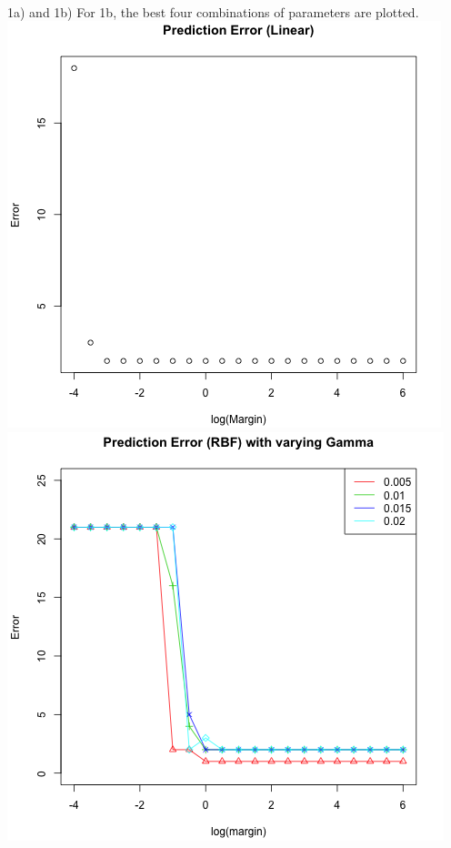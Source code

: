 \documentclass[]{../util/ColumbiaAssm}
\begin{document}
\begin{questions}
\begin{solution}
\\1a) and 1b) For 1b, the best four combinations of parameters are plotted.
\\\includegraphics[scale=0.7]{Err_Lin}
\\\includegraphics[scale=0.7]{Err_RBF}

\end{solution}
\end{questions}
\end{document}
